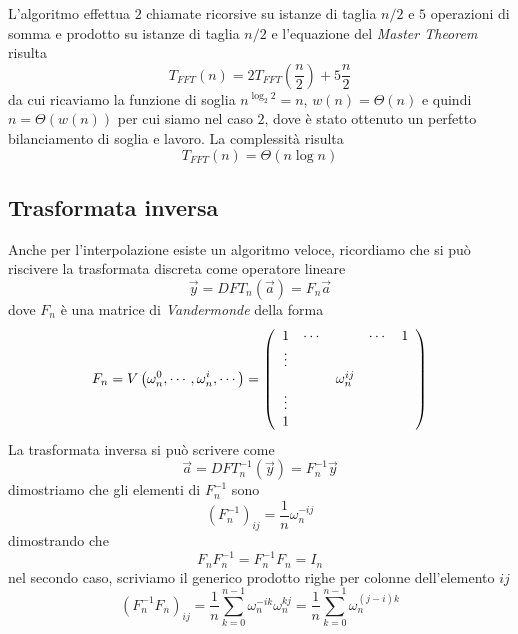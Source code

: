 L'algoritmo effettua $2$ chiamate ricorsive su istanze di taglia $n/2$ e $5$ operazioni di somma e prodotto su istanze di taglia $n/2$ e l'equazione del \textit{Master Theorem} risulta
\begin{equation*}
    T_{FFT} (n) = 2 T_{FFT} \left( \frac{n}{2} \right) + 5 \frac{n}{2} %
\end{equation*}
da cui ricaviamo la funzione di soglia $n^{\log_2 2} = n$, $w(n)= \Theta \left( n \right)$ e quindi $n = \Theta \left( w\left( n \right) \right)$ per cui siamo nel caso $2$, dove è stato ottenuto un perfetto bilanciamento di soglia e lavoro. La complessità risulta
\begin{equation*}
    T_{FFT} (n) = \Theta \left( n \log n \right)
\end{equation*}

\subsection{Trasformata inversa}
Anche per l'interpolazione esiste un algoritmo veloce, ricordiamo che si può riscivere la trasformata discreta come operatore lineare 
$$\vec{y} = DFT_n \left( \vec{a} \right) = F_n \vec{a}$$
dove $F_n$ è una matrice di \textit{Vandermonde} della forma
\begin{equation*}
    F_n = V\left( \omega_n^0, \cdots, \omega_n^i, \cdots \right) =
    \left(
        \begin{array}[h]{ccccc}
            1 & \cdots & & \cdots & 1 \\
            \vdots \\
            & & \omega_n^{ij} \\
            \vdots \\
            1\\
        \end{array}
    \right)
\end{equation*}
La trasformata inversa si può scrivere come 
$$\vec{a} = DFT_n^{-1} \left( \vec{y} \right) = F_n^{-1}\vec{y}$$
dimostriamo che gli elementi di $F_n^{-1}$ sono 
\begin{equation*}
    \left( F_n^{-1} \right)_{ij} = \frac{1}{n} \omega_n^{-ij}
\end{equation*}
dimostrando che
\begin{equation*}
    F_n F_n^{-1} = F_n^{-1} F_n = I_n
\end{equation*}
nel secondo caso, scriviamo il generico prodotto righe per colonne dell'elemento $ij$
\begin{equation*}
    \left( F_n^{-1} F_n \right)_{ij} =
    \frac{1}{n} \sum_{k=0}^{n-1} \omega_n^{-ik} \omega_n^{kj} =
    \frac{1}{n} \sum_{k=0}^{n-1} \omega_n^{(j-i)k}
\end{equation*}
